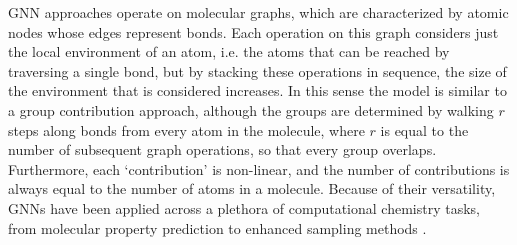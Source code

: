 GNN approaches operate on molecular graphs, which are characterized by atomic
nodes whose edges represent bonds. Each operation on this graph considers just
the local environment of an atom, i.e. the atoms that can be reached by
traversing a single bond, but by stacking these operations in sequence, the size
of the environment that is considered increases. In this sense the model is
similar to a group contribution approach, although the groups are determined by
walking $r$ steps along bonds from every atom in the molecule, where $r$ is
equal to the number of subsequent graph operations, so that every group
overlaps. Furthermore, each `contribution' is non-linear, and the number of
contributions is always equal to the number of atoms in a molecule. Because of
their versatility, GNNs have been applied across a plethora of computational
chemistry tasks, from molecular property prediction \cite{
leeTransferLearningMaterials2020, louisGraphConvolutionalNeural2020,
rittigGraphNeuralNetworks2022, singhGraphNeuralNetworks2022} to enhanced
sampling methods \cite{dietrichMachineLearningNucleation2023,
erricaDeepGraphNetwork2021}.